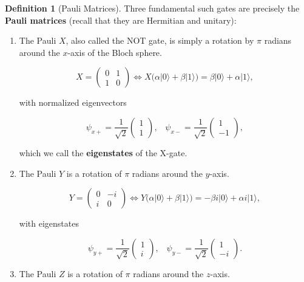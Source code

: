 \documentclass{article}
\theoremstyle{definition}
\newtheorem{definition}{Definition}[section]
\begin{document}
      \begin{definition}[Pauli Matrices]
        Three fundamental such gates are precisely the \textbf{Pauli matrices} (recall that they are Hermitian and unitary):
        \begin{enumerate}
          \item The Pauli $X$, also called the NOT gate, is simply a rotation by $\pi$ radians around the $x$-axis of the Bloch sphere.

              \[X = \begin{pmatrix} 0 & 1 \\ 1 & 0 \end{pmatrix} \iff X \big(\alpha |0\rangle + \beta |1 \rangle \big) = \beta |0\rangle + \alpha |1\rangle,\]

            with normalized eigenvectors

              \[\psi_{x+} = \frac{1}{\sqrt{2}} \begin{pmatrix} 1 \\ 1 \end{pmatrix}, \;\;\; \psi_{x-} = \frac{1}{\sqrt{2}} \begin{pmatrix} 1 \\ -1 \end{pmatrix},\]

            which we call the \textbf{eigenstates} of the X-gate.

          \item The Pauli $Y$ is a rotation of $\pi$ radians around the $y$-axis.

              \[
                Y = \begin{pmatrix} 0 & -i \\ i & 0 \end{pmatrix} \iff Y \big( \alpha |0\rangle + \beta |1 \rangle \big) = -\beta i |0\rangle + \alpha i |1 \rangle,\]

            with eigenstates

              \[\psi_{y+} = \frac{1}{\sqrt{2}} \begin{pmatrix} 1 \\ i \end{pmatrix}, \;\;\; \psi_{y-} = \frac{1}{\sqrt{2}} \begin{pmatrix} 1 \\ -i \end{pmatrix}.\]

          \item The Pauli $Z$ is a rotation of $\pi$ radians around the $z$-axis.


\end{enumerate}
\end{definition}
\end{document}

